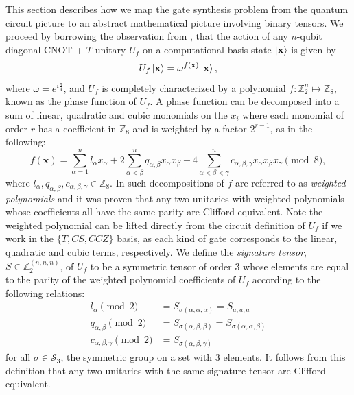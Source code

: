 \documentclass[titlepage]{article}
\theoremstyle{definition}
\theoremstyle{problem}
\theoremstyle{lemma}
\begin{document}
This section describes how we map the gate synthesis problem from the quantum circuit picture to an abstract mathematical picture involving binary tensors. We proceed by borrowing the observation from \cite{5_Amy_2013},\cite{6_Amy_2013} that the action of any $n$-qubit diagonal CNOT + $T$ unitary $U_f$ on a computational basis state $\left\vert{\mathbf{x}}\right\rangle$ is given by
\begin{equation}
U_f \left\vert{\mathbf{x}}\right\rangle = \omega^{f(\mathbf{x})}\left\vert{\mathbf{x}}\right\rangle,
\end{equation}
where $\omega = e^{i \frac{\pi}{4}}$, and $U_f$ is completely characterized by a polynomial $f: \mathbb{Z}_2^n \mapsto \mathbb{Z}_8$, known as the phase function of $U_f$. A phase function can be decomposed into a sum of linear, quadratic and cubic monomials on the $x_i$ where each monomial of order $r$ has a coefficient in $\mathbb{Z}_8$ and is weighted by a factor $2^{r-1}$, as in the following:
\begin{equation}
f(\mathbf{x}) = \sum_{\alpha=1}^{n}l_{\alpha}x_\alpha + 2\sum_{\alpha<\beta}^{n} q_{\alpha,\beta}x_\alpha x_\beta + 4\sum_{\alpha<\beta<\gamma}^{n}c_{\alpha,\beta,\gamma}x_\alpha x_\beta x_\gamma \pmod{8},
\end{equation}
where $l_{\alpha},q_{\alpha,\beta},c_{\alpha,\beta,\gamma} \in \mathbb{Z}_8$.
In \cite{4_Campbell_2017} such decompositions of $f$ are referred to as \emph{weighted polynomials} and it was proven that any two unitaries with weighted polynomials whose coefficients all have the same parity are Clifford equivalent. Note the weighted polynomial can be lifted directly from the circuit definition of $U_f$ if we work in the $\{T, CS, CCZ\}$ basis, as each kind of gate corresponds to the linear, quadratic and cubic terms, respectively. We define the \emph{signature tensor}, $S \in \mathbb{Z}_2^{(n,n,n)}$, of $U_f$ to be a symmetric tensor of order 3 whose elements are equal to the parity of the weighted polynomial coefficients of $U_f$ according to the following relations:
\begin{align}
l_{\alpha} \pmod{2} &= S_{\sigma(\alpha,\alpha,\alpha)} = S_{a,a,a}\\
q_{\alpha,\beta} \pmod{2} &= S_{\sigma(\alpha,\beta,\beta)} = S_{\sigma(\alpha,\alpha,\beta)}\\
c_{\alpha,\beta,\gamma} \pmod{2} &= S_{\sigma(\alpha,\beta,\gamma)}
\end{align}
for all $\sigma \in \mathcal{S}_3$, the symmetric group on a set with 3 elements. It follows from this definition that any two unitaries with the same signature tensor are Clifford equivalent.
\end{document}
